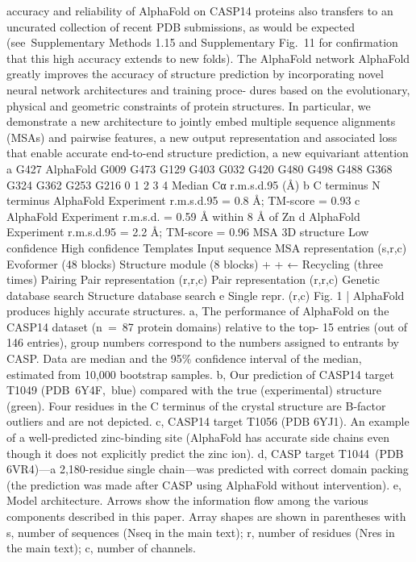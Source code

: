 accuracy and reliability of AlphaFold on CASP14 proteins also transfers
to an uncurated collection of recent PDB submissions, as would be
expected (see Supplementary Methods 1.15 and Supplementary Fig. 11
for confirmation that this high accuracy extends to new folds).
The AlphaFold network
AlphaFold greatly improves the accuracy of structure prediction by
incorporating novel neural network architectures and training proce-
dures based on the evolutionary, physical and geometric constraints
of protein structures. In particular, we demonstrate a new architecture
to jointly embed multiple sequence alignments (MSAs) and pairwise
features, a new output representation and associated loss that enable
accurate end-to-end structure prediction, a new equivariant attention
a
G427
AlphaFold
G009
G473
G129
G403
G032
G420
G480
G498
G488
G368
G324
G362
G253
G216
0
1
2
3
4
Median Cα r.m.s.d.95 (Å)
b
C terminus
N terminus
AlphaFold
Experiment
r.m.s.d.95 = 0.8 Å; TM-score = 0.93
c
AlphaFold
Experiment
r.m.s.d. = 0.59 Å within 8 Å of Zn
d
AlphaFold
Experiment
r.m.s.d.95 = 2.2 Å; TM-score = 0.96
MSA
3D structure
Low
conﬁdence
High
conﬁdence
Templates
Input sequence
MSA
representation
(s,r,c)
Evoformer
(48 blocks)
Structure
module
 (8 blocks)
+
+
← Recycling (three times)
Pairing
Pair
representation
(r,r,c)
Pair
representation
(r,r,c)
Genetic
database
search
Structure
database
search
e
Single repr. (r,c)
Fig. 1 | AlphaFold produces highly accurate structures. a, The performance
of AlphaFold on the CASP14 dataset (n = 87 protein domains) relative to the top-
15 entries (out of 146 entries), group numbers correspond to the numbers
assigned to entrants by CASP. Data are median and the 95\% confidence interval
of the median, estimated from 10,000 bootstrap samples. b, Our prediction of
CASP14 target T1049 (PDB 6Y4F, blue) compared with the true (experimental)
structure (green). Four residues in the C terminus of the crystal structure are
B-factor outliers and are not depicted. c, CASP14 target T1056 (PDB 6YJ1).
An example of a well-predicted zinc-binding site (AlphaFold has accurate side
chains even though it does not explicitly predict the zinc ion). d, CASP target
T1044 (PDB 6VR4)—a 2,180-residue single chain—was predicted with correct
domain packing (the prediction was made after CASP using AlphaFold without
intervention). e, Model architecture. Arrows show the information flow among
the various components described in this paper. Array shapes are shown in
parentheses with s, number of sequences (Nseq in the main text); r, number of
residues (Nres in the main text); c, number of channels.
